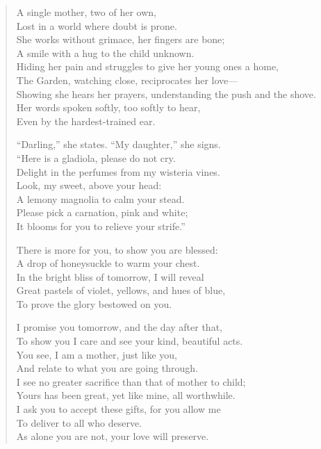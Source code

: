\documentclass[11pt, letterpaper]{article}
\begin{document}
\begin{verse}
A single mother, two of her own,\\
Lost in a world where doubt is prone.\\
She works without grimace, her fingers are bone;\\
A smile with a hug to the child unknown.\\
Hiding her pain and struggles to give her young ones a home,\\
The Garden, watching close, reciprocates her love---\\
Showing she hears her prayers, understanding the push and the shove.\\
Her words spoken softly, too softly to hear,\\
Even by the hardest-trained ear.

``Darling,'' she states. ``My daughter,'' she signs.\\
``Here is a gladiola, please do not cry.\\
Delight in the perfumes from my wisteria vines.\\
Look, my sweet, above your head:\\
A lemony magnolia to calm your stead.\\
Please pick a carnation, pink and white;\\
It blooms for you to relieve your strife.''

There is more for you, to show you are blessed:\\
A drop of honeysuckle to warm your chest.\\
In the bright bliss of tomorrow, I will reveal\\
Great pastels of violet, yellows, and hues of blue,\\
To prove the glory bestowed on you.

I promise you tomorrow, and the day after that,\\
To show you I care and see your kind, beautiful acts.\\
You see, I am a mother, just like you,\\
And relate to what you are going through.\\
I see no greater sacrifice than that of mother to child;\\
Yours has been great, yet like mine, all worthwhile.\\
I ask you to accept these gifts, for you allow me\\
To deliver to all who deserve.\\
As alone you are not, your love will preserve.


\end{verse}
\end{document}
